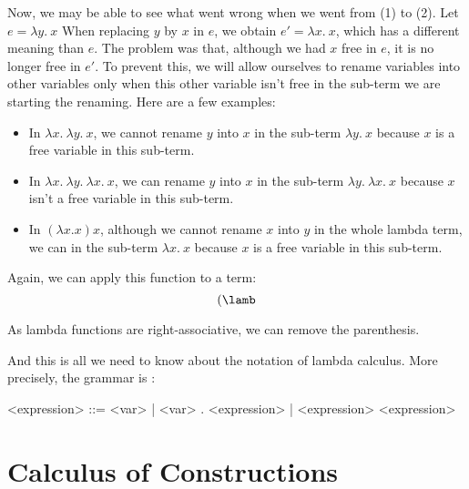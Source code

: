 Now, we may be able to see what went wrong when we went from (1) to (2). Let $e = \lambda y.\ x$ When replacing $y$ by $x$ in $e$, we obtain $e' = \lambda x.\ x$, which has a different meaning than $e$. The problem was that, although we had $x$ free in $e$, it is no longer free in $e'$. To prevent this, we will allow ourselves to rename variables into other variables only when this other variable isn't free in the sub-term we are starting the renaming. Here are a few examples:
\begin{itemize}
    \item In $\lambda x.\ \lambda y.\ x$, we cannot rename $y$ into $x$ in the sub-term $\lambda y.\ x$ because $x$ is a free variable in this sub-term.
    \item In $\lambda x.\ \lambda y.\ \lambda x.\ x$, we can rename $y$ into $x$ in the sub-term $\lambda y.\ \lambda x.\ x$ because $x$ isn't a free variable in this sub-term.
    \item In $(\lambda x. x) x$, although we cannot rename $x$ into $y$ in the whole lambda term, we can in the sub-term $\lambda x.\ x$ because $x$ is a free variable in this sub-term. 
\end{itemize} 

\begin{definition}
    
\end{definition}




Again, we can apply this function to a term:
    $$(\lamb$$



As lambda functions are right-associative, we can remove the parenthesis.







And this is all we need to know about the notation of lambda calculus. More precisely, the grammar is :

<expression> ::= <var> | \lambda <var> . <expression> | <expression> <expression>



\section{Calculus of Constructions}

